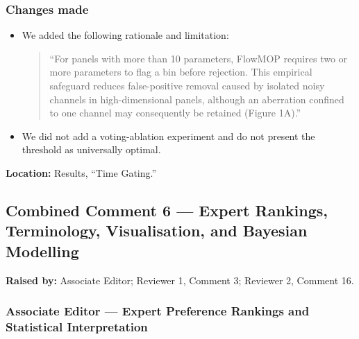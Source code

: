 \documentclass[
  11pt,
  a4paper,
]{article}
\begin{document}
\subsubsection{Changes made}\label{changes-made-4}

\begin{itemize}
\item
  We added the following rationale and limitation:

  \begin{quote}
  ``For panels with more than 10 parameters, FlowMOP requires two or
  more parameters to flag a bin before rejection. This empirical
  safeguard reduces false-positive removal caused by isolated noisy
  channels in high-dimensional panels, although an aberration confined
  to one channel may consequently be retained (Figure 1A).''
  \end{quote}
\item
  We did not add a voting-ablation experiment and do not present the
  threshold as universally optimal.
\end{itemize}

\textbf{Location:} Results, ``Time Gating.''

\subsection{Combined Comment 6 --- Expert Rankings, Terminology,
Visualisation, and Bayesian
Modelling}\label{combined-comment-6--expert-rankings-terminology-visualisation-and-bayesian-modelling}

\textbf{Raised by:} Associate Editor; Reviewer 1, Comment 3; Reviewer 2,
Comment 16.

\subsubsection{Associate Editor --- Expert Preference Rankings and
Statistical
Interpretation}\label{associate-editor--expert-preference-rankings-and-statistical-interpretation}
\end{document}
